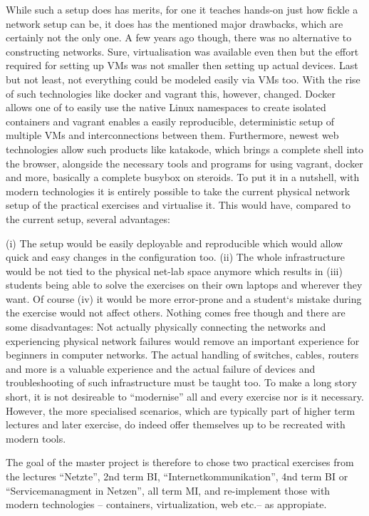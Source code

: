 While such a setup does has merits,
for one it teaches hands-on just how fickle a network setup can be,
it does has the mentioned major drawbacks,
which are certainly not the only one.
A few years ago though,
there was no alternative to constructing networks.
Sure, virtualisation was available even then but the effort required for setting
up VMs was not smaller then setting up actual devices.
Last but not least, not everything could be modeled easily via VMs too.
With the rise of such technologies like docker and vagrant this,
however, changed.
Docker allows one of to easily use the native Linux namespaces to create isolated containers and vagrant enables a easily reproducible,
deterministic setup of multiple VMs and interconnections between them.
Furthermore, newest web technologies allow such products like katakode,
which brings a complete shell into the browser,
alongside the necessary tools and programs for using vagrant,
docker and more, basically a complete busybox on steroids.
To put it in a nutshell,
with modern technologies it is entirely possible to take the current physical network
setup of the practical exercises and virtualise it.
This would have, compared to the current setup, several advantages:

(i) The setup would be easily deployable and reproducible which would
allow quick and easy changes in the configuration too.
(ii) The whole infrastructure would be not tied to the physical net-lab
space anymore which results in
(iii) students being able to solve the exercises on their own laptops and wherever they want.
Of course (iv) it would be more error-prone and a student‘s mistake
during the exercise would not affect others.
Nothing comes free though and there are some disadvantages:
Not actually physically connecting the networks and experiencing physical network
failures would remove an important experience for beginners in computer networks.
The actual handling of switches, cables, routers and more is a valuable experience
and the actual failure of devices and troubleshooting of such infrastructure must be taught too.
To make a long story short, it is not desireable to \enquote{modernise}
all and every exercise nor is it necessary.
However, the more specialised scenarios,
which are typically part of higher term lectures and later exercise,
do indeed offer themselves up to be recreated with modern tools.

The goal of the master project is therefore to chose two practical exercises from the lectures
\enquote{Netzte}, 2nd term BI, \enquote{Internetkommunikation}, 4nd term BI or
\enquote{Servicemanagment in Netzen}, all term MI,
and re-implement those with modern technologies – containers, virtualization, web etc.– as appropiate.

